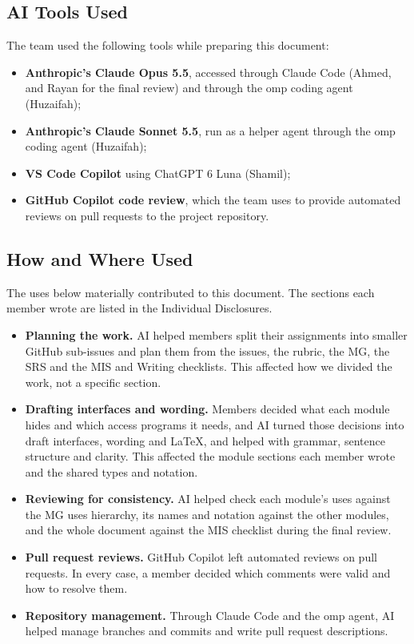 \documentclass[12pt, titlepage]{article}
\begin{document}
\subsection{AI Tools Used}

The team used the following tools while preparing this document:

\begin{itemize}
  \item \textbf{Anthropic's Claude Opus 5.5}, accessed through Claude Code
  (Ahmed, and Rayan for the final review) and through the omp coding agent
  (Huzaifah);
  \item \textbf{Anthropic's Claude Sonnet 5.5}, run as a helper agent through
  the omp coding agent (Huzaifah);
  \item \textbf{VS Code Copilot} using ChatGPT 6 Luna (Shamil);
  \item \textbf{GitHub Copilot code review}, which the team uses to provide
  automated reviews on pull requests to the project repository.
\end{itemize}

\subsection{How and Where Used}

The uses below materially contributed to this document. The sections each
member wrote are listed in the Individual Disclosures.

\begin{itemize}
  \item \textbf{Planning the work.} AI helped members split their assignments
  into smaller GitHub sub-issues and plan them from the issues, the rubric, the
  MG, the SRS and the MIS and Writing checklists. This affected how we divided
  the work, not a specific section.

  \item \textbf{Drafting interfaces and wording.} Members decided what each
  module hides and which access programs it needs, and AI turned those
  decisions into draft interfaces, wording and \LaTeX{}, and helped with
  grammar, sentence structure and clarity. This affected the module sections
  each member wrote and the shared types and notation.

  \item \textbf{Reviewing for consistency.} AI helped check each module's uses
  against the MG uses hierarchy, its names and notation against the other
  modules, and the whole document against the MIS checklist during the final
  review.

  \item \textbf{Pull request reviews.} GitHub Copilot left automated reviews on
  pull requests. In every case, a member decided which comments were valid and
  how to resolve them.

  \item \textbf{Repository management.} Through Claude Code and the omp agent,
  AI helped manage branches and commits and write pull request descriptions.
\end{itemize}
\end{document}
